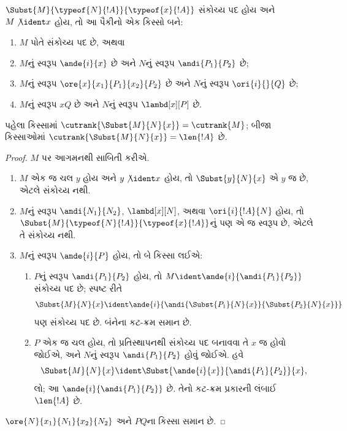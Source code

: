 \begin{lem}
  $\Subst{M}{\typeof{N}{!A}}{\typeof{x}{!A}}$ સંકોચ્ય પદ
  હોય અને $M \not\ident x$ હોય, તો આ પૈકીનો
  એક કિસ્સો બને:
  \begin{enumerate}
  \item $M$ પોતે સંકોચ્ય પદ છે, અથવા
  \item $M$નું સ્વરૂપ $\ande{i}{x}$ છે અને
    $N$નું સ્વરૂપ $\andi{P_1}{P_2}$ છે;
  \item $M$નું સ્વરૂપ $\ore{x}{x_1}{P_1}{x_2}{P_2}$ છે અને
    $N$નું સ્વરૂપ $\ori{i}{}{Q}$ છે;
  \item $M$નું સ્વરૂપ $x Q$ છે અને
    $N$નું સ્વરૂપ $\lambd[x][P]$ છે.
  \end{enumerate}
  પહેલા કિસ્સામાં $\cutrank{\Subst{M}{N}{x}} = \cutrank{M}$;
  બીજા કિસ્સાઓમાં $\cutrank{\Subst{M}{N}{x}} = \len{!A}$ છે.
\end{lem}
\begin{proof}
  $M$ પર આગમનથી સાબિતી કરીએ.
  \begin{enumerate}
  \item $M$ એક જ ચલ $y$ હોય અને $y \not\ident x$ હોય,
    તો $\Subst{y}{N}{x}$ એ $y$ જ છે, એટલે સંકોચ્ય નથી.
  \item $M$નું સ્વરૂપ $\andi{N_1}{N_2}$, $\lambd[x][N]$,
    અથવા $\ori{i}{!A}{N}$ હોય, તો
    $\Subst{M}{\typeof{N}{!A}}{\typeof{x}{!A}}$નું પણ
    એ જ સ્વરૂપ છે, એટલે તે સંકોચ્ય નથી.
  \item $M$નું સ્વરૂપ $\ande{i}{P}$ હોય, તો બે કિસ્સા લઈએ:
    \begin{enumerate}
      \item $P$નું સ્વરૂપ $\andi{P_1}{P_2}$ હોય, તો
        $M \ident \ande{i}{\andi{P_1}{P_2}}$ સંકોચ્ય પદ છે;
        સ્પષ્ટ રીતે
        \[
        \Subst{M}{N}{x} \ident
        \ande{i}{\andi{\Subst{P_1}{N}{x}}{\Subst{P_2}{N}{x}}}
        \]
        પણ સંકોચ્ય પદ છે. બંનેના કટ-ક્રમ સમાન છે.
      \item $P$ એક જ ચલ હોય, તો પ્રતિસ્થાપનથી સંકોચ્ય
        પદ બનાવવા તે $x$ જ હોવો જોઈએ, અને $N$નું
        સ્વરૂપ $\andi{P_1}{P_2}$ હોવું જોઈએ. હવે
        \[
        \Subst{M}{N}{x} \ident \Subst{\ande{i}{x}}{\andi{P_1}{P_2}}{x},
        \]
        લો; આ $\ande{i}{\andi{P_1}{P_2}}$ છે.
        તેનો કટ-ક્રમ પ્રકારની લંબાઈ $\len{!A}$ છે.
    \end{enumerate}
  \end{enumerate}
  $\ore{N}{x_1}{N_1}{x_2}{N_2}$ અને $P Q$ના કિસ્સા સમાન છે.
\end{proof}

